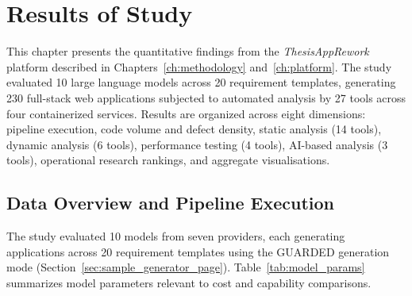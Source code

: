 \chapter{Results of Study}
\label{ch:results}

This chapter presents the quantitative findings from the \textit{ThesisAppRework} platform described in Chapters~\ref{ch:methodology} and~\ref{ch:platform}. The study evaluated 10 large language models across 20 requirement templates, generating 230 full-stack web applications subjected to automated analysis by 27 tools across four containerized services. Results are organized across eight dimensions: pipeline execution, code volume and defect density, static analysis (14 tools), dynamic analysis (6 tools), performance testing (4 tools), AI-based analysis (3 tools), operational research rankings, and aggregate visualisations.

\section{Data Overview and Pipeline Execution}
\label{sec:data_overview}

The study evaluated 10 models from seven providers, each generating applications across 20 requirement templates using the GUARDED generation mode (Section~\ref{sec:sample_generator_page}). Table~\ref{tab:model_params} summarizes model parameters relevant to cost and capability comparisons.

